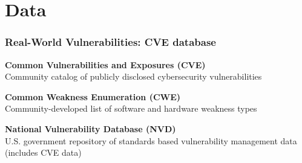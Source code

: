 \documentclass[169]{beamer}
\begin{document}
\section{Data}

\begin{frame}\frametitle{Real-World Vulnerabilities: CVE database}
  \textbf{Common Vulnerabilities and Exposures (CVE)} \\
  Community catalog of publicly disclosed cybersecurity vulnerabilities

  \textbf{Common Weakness Enumeration (CWE)} \\
  Community-developed list of software and hardware weakness types

  \textbf{National Vulnerability Database (NVD)} \\
  U.S. government repository of standards based vulnerability management data (includes CVE data)
\end{frame}

\begin{frame}[label=current]
\end{frame}
\end{document}
